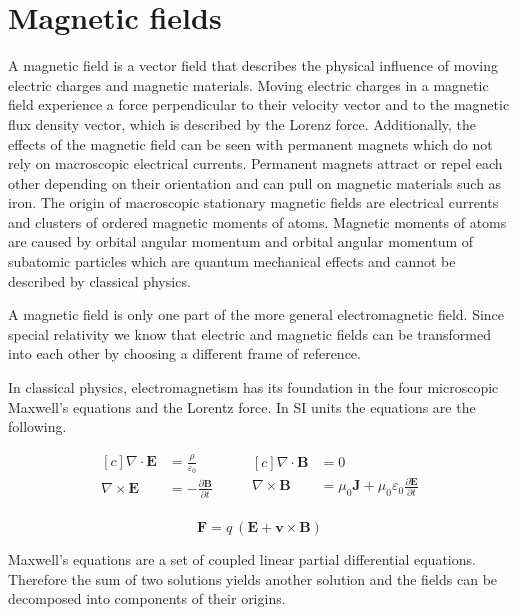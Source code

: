 \section{Magnetic fields}

A magnetic field is a vector field that describes the physical influence of moving electric charges and magnetic materials. Moving electric charges in a magnetic field experience a force perpendicular to their velocity vector and to the magnetic flux density vector, which is described by the Lorenz force. Additionally, the effects of the magnetic field can be seen with permanent magnets which do not rely on macroscopic electrical currents. Permanent magnets attract or repel each other depending on their orientation and can pull on magnetic materials such as iron. The origin of macroscopic stationary magnetic fields are electrical currents and clusters of ordered magnetic moments of atoms. Magnetic moments of atoms are caused by orbital angular momentum and orbital angular momentum of subatomic particles which are quantum mechanical effects and cannot be described by classical physics.

A magnetic field is only one part of the more general electromagnetic field. Since special relativity we know that electric and magnetic fields can be transformed into each other by choosing a different frame of reference.

In classical physics, electromagnetism has its foundation in the four microscopic Maxwell's equations and the Lorentz force. In SI units the equations are the following.

\begin{equation*}
    \begin{aligned}[c]
        \nabla \cdot \bm{E} &= {\frac{\rho }{\varepsilon_{0}}}\\
        \nabla \times \bm{E} &= -{\frac{\partial \bm{B}}{\partial t}}\\
    \end{aligned}
    \qquad
    \begin{aligned}[c]
        \nabla \cdot \bm{B} &= 0\\
        \nabla \times \bm{B} &= \mu_0 \bm{J} + \mu_0 \varepsilon_0 {\frac{\partial \bm{E}}{\partial t}}\\
    \end{aligned}
\end{equation*}

\[\bm{F} = q\ (\bm{E} + \bm{v} \times \bm{B})\]

Maxwell's equations are a set of coupled linear partial differential equations. Therefore the sum of two solutions yields another solution and the fields can be decomposed into components of their origins.

